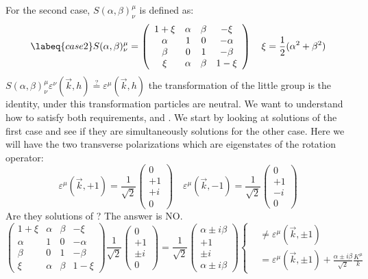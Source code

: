 \documentclass[../main.tex]{subfiles}
\begin{document}
For the second case, $S(\alpha,\beta)^\mu_\nu$ is defined as:
\begin{equation}
\labeq{case2}
S(\alpha,\beta)^\mu_\nu=\left(\begin{array}{cccc}
    1+\xi & \alpha & \beta & -\xi \\
    \alpha & 1 & 0 & -\alpha \\
    \beta & 0 & 1 & -\beta \\
    \xi & \alpha & \beta & 1-\xi
\end{array}\right) \quad \xi=\frac{1}{2}(\alpha^2+\beta^2)
\end{equation}
$S(\alpha,\beta)^\mu_\nu\varepsilon^\nu(\vec{k},h)\stackrel{?}{=}\varepsilon^\mu(\vec{k},h)$ the transformation of the little group is the identity, under this transformation particles are neutral. We want to understand how to satisfy both requirements,  and . We start by looking at solutions of the first case and see if they are simultaneously solutions for the other case. Here we will have the two transverse polarizations which are eigenstates of the rotation operator:
\[
\varepsilon^\mu(\vec{k},+1)=\frac{1}{\sqrt{2}}\left(\begin{array}{c}
    0 \\
    +1 \\
    +i \\
    0
\end{array}\right)
\quad
\varepsilon^\mu(\vec{k},-1)=\frac{1}{\sqrt{2}}\left(\begin{array}{c}
    0 \\
    +1 \\
    -i \\
    0
\end{array}\right)
\]
Are they solutions of ? The answer is NO.
\[
\left(\begin{array}{cccc}
    1+\xi & \alpha & \beta & -\xi \\
    \alpha & 1 & 0 & -\alpha \\
    \beta & 0 & 1 & -\beta \\
    \xi & \alpha & \beta & 1-\xi
\end{array}\right)\frac{1}{\sqrt{2}}\left(\begin{array}{c}
    0 \\
    +1 \\
    \pm i \\
    0
\end{array}\right)=\frac{1}{\sqrt{2}}\left(\begin{array}{c}
    \alpha\pm i\beta \\
    +1 \\
    \pm i \\
    \alpha\pm i\beta
\end{array}\right)\left\{
\begin{aligned}
&\neq\varepsilon^\mu(\vec{k},\pm1)\\
&=\varepsilon^\mu(\vec{k},\pm1)+\frac{\alpha\pm i\beta}{\sqrt{2}}\frac{K^\mu}{k}
\end{aligned}
\right.
\]
\end{document}
